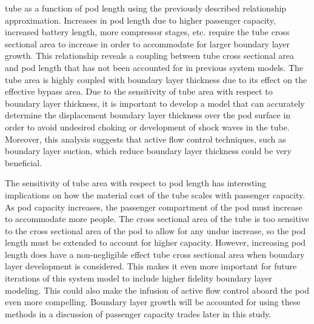 tube as a function of pod length using the previously described relationship
approximation. Increases in pod length due to higher passenger
capacity, increased battery length, more compressor stages, etc. require the
tube cross sectional area to increase in order to accommodate for larger
boundary layer growth. This relationship reveals a coupling between tube cross
sectional area and pod length that has not been accounted for in previous system models.
The tube area is highly coupled with boundary layer thickness due to its effect on the effective bypass area.
Due to the sensitivity of tube area with respect to boundary layer thickness,
it is important to develop a model that can accurately determine the
displacement boundary layer thickness over the pod surface in order to avoid
undesired choking or development of shock waves in the tube. Moreover,
this analysis suggests that active flow control techniques, such as boundary layer suction,
which reduce boundary layer thickness could be very beneficial.

The sensitivity of tube area with respect to pod length has interesting implications on how the material cost of the tube
scales with passenger capacity. As pod capacity increases, the passenger compartment of the pod
must increase to accommodate more people. The cross sectional area of the tube is too sensitive to the cross sectional
area of the pod to allow for any undue increase, so the pod length must be extended to account for higher capacity.
However, increasing pod length does have a non-negligible effect tube cross sectional area when boundary layer
development is considered. This makes it even more important for future iterations of this system model to include
higher fidelity boundary layer modeling. This could also make the infusion of active flow control aboard
the pod even more compelling. Boundary layer growth will be accounted for using these methods in a discussion of
passenger capacity trades later in this study.
